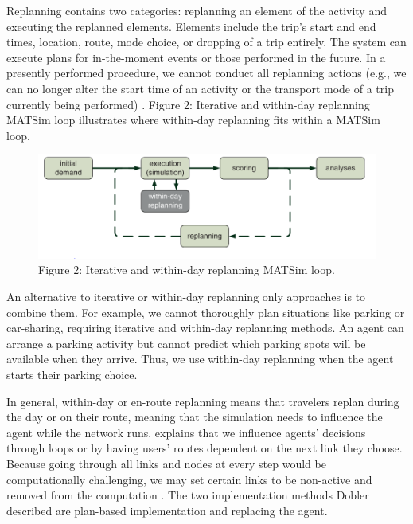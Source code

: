 \documentclass[
  letterpaper,
  authoryear]{elsarticle}
\begin{document}
Replanning contains two categories: replanning an element of the
activity and executing the replanned elements. Elements include the
trip's start and end times, location, route, mode choice, or dropping of
a trip entirely. The system can execute plans for in-the-moment events
or those performed in the future. In a presently performed procedure, we
cannot conduct all replanning actions (e.g., we can no longer alter the
start time of an activity or the transport mode of a trip currently
being performed) \citep{dobler2016}. Figure 2: Iterative and within-day
replanning MATSim loop illustrates where within-day replanning fits
within a MATSim loop.

\begin{figure}

{\centering \includegraphics{figures/fig2.png}

}

\caption{Figure 2: Iterative and within-day replanning MATSim loop.}

\end{figure}

An alternative to iterative or within-day replanning only approaches is
to combine them. For example, we cannot thoroughly plan situations like
parking or car-sharing, requiring iterative and within-day replanning
methods. An agent can arrange a parking activity but cannot predict
which parking spots will be available when they arrive. Thus, we use
within-day replanning when the agent starts their parking choice.

In general, within-day or en-route replanning means that travelers
replan during the day or on their route, meaning that the simulation
needs to influence the agent while the network runs. \citet{dobler2016}
explains that we influence agents' decisions through loops or by having
users' routes dependent on the next link they choose. Because going
through all links and nodes at every step would be computationally
challenging, we may set certain links to be non-active and removed from
the computation \citep{dobler2016}. The two implementation methods
Dobler described are plan-based implementation and replacing the agent.
\end{document}
